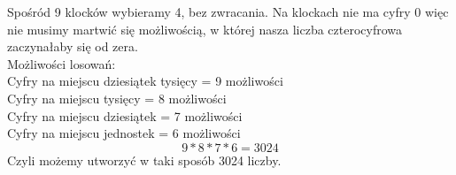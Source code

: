 \medskip
{} 
\medskip

Spośród 9 klocków wybieramy 4, bez zwracania. Na klockach nie ma cyfry 0
więc nie musimy martwić się możliwością, w której nasza liczba czterocyfrowa
zaczynałaby się od zera.\\

Możliwości losowań:\\
Cyfry na miejscu dziesiątek tysięcy = 9 możliwości\\
Cyfry na miejscu tysięcy = 8 możliwości\\
Cyfry na miejscu dziesiątek = 7 możliwości\\
Cyfry na miejscu jednostek = 6 możliwości
$$
9*8*7*6 = 3024
$$
Czyli możemy utworzyć w taki sposób 3024 liczby.

